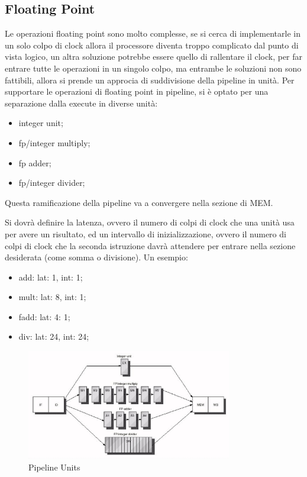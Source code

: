 \documentclass[12pt]{article}
\begin{document}
\subsection{Floating Point}
Le operazioni floating point sono molto complesse, se si cerca di implementarle in un solo colpo di clock allora il processore diventa troppo complicato dal punto di vista logico, un altra soluzione potrebbe essere quello di rallentare il clock, per far entrare tutte le operazioni in un singolo colpo, ma entrambe le soluzioni non sono fattibili, allora si prende un approcia di suddivisione della pipeline in unit\`a. Per supportare le operazioni di floating point in pipeline, si \`e optato per una separazione dalla execute in diverse unit\`a:
\begin{itemize}
    \item integer unit;
    \item fp/integer multiply;
    \item fp adder;
    \item fp/integer divider;
\end{itemize}
Questa ramificazione della pipeline va a convergere nella sezione di MEM.

Si dovr\`a definire la latenza, ovvero il numero di colpi di clock che una unit\`a usa per avere un risultato, ed un intervallo di inizializzazione, ovvero il numero di colpi di clock che la seconda istruzione davr\`a attendere per entrare nella sezione desiderata (come somma o divisione). Un esempio:
\begin{itemize}
    \item add: lat: 1, int: 1;
    \item mult: lat: 8, int: 1;
    \item fadd: lat: 4: 1;
    \item div: lat: 24, int: 24;
\end{itemize}
\begin{figure}[H]
    \centering
    \includegraphics[width=0.8\textwidth]{pipeline-units.png}
    \caption{Pipeline Units}
    \label{fig:pipeline-units}
\end{figure}
\end{document}
